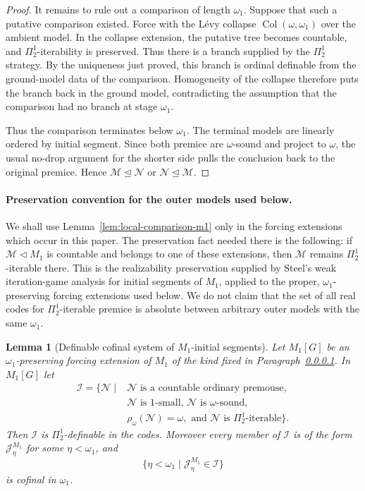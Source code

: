 \documentclass[a4paper,11pt]{article}
\newtheorem{lemma}[theorem]{Lemma}
\begin{document}
\begin{proof}
It remains to rule out a comparison of length $\omega_1$.  Suppose that such a putative comparison existed.  Force with the L\'evy collapse $\operatorname{Col}(\omega,\omega_1)$ over the ambient model.  In the collapse extension, the putative tree becomes countable, and $\Pi^1_2$-iterability is preserved.  Thus there is a branch supplied by the $\Pi^1_2$ strategy.  By the uniqueness just proved, this branch is ordinal definable from the ground-model data of the comparison.  Homogeneity of the collapse therefore puts the branch back in the ground model, contradicting the assumption that the comparison had no branch at stage $\omega_1$.

Thus the comparison terminates below $\omega_1$.  The terminal models are linearly ordered by initial segment.  Since both premice are $\omega$-sound and project to $\omega$, the usual no-drop argument for the shorter side pulls the conclusion back to the original premice.  Hence $\mathcal M\trianglelefteq\mathcal N$ or $\mathcal N\trianglelefteq\mathcal M$.
\end{proof}

\paragraph{Preservation convention for the outer models used below.}\label{par:steel-preservation-convention}
We shall use Lemma~\ref{lem:local-comparison-m1} only in the forcing extensions which occur in this paper.  The preservation fact needed there is the following: if $\mathcal M\triangleleft M_1$ is countable and belongs to one of these extensions, then $\mathcal M$ remains $\Pi^1_2$-iterable there.  This is the realizability preservation supplied by Steel's weak iteration-game analysis for initial segments of $M_1$, applied to the proper, $\omega_1$-preserving forcing extensions used below.  We do not claim that the set of all real codes for $\Pi^1_2$-iterable premice is absolute between arbitrary outer models with the same $\omega_1$.

\begin{lemma}[Definable cofinal system of $M_1$-initial segments]
\label{lem:definable-m1-initial-segments}
Let $M_1[G]$ be an $\omega_1$-preserving forcing extension of $M_1$ of the kind fixed in Paragraph~\ref{par:steel-preservation-convention}.  In $M_1[G]$ let
\[
\begin{split}
   \mathcal I=\bigl\{\mathcal N\mid {}&
      \mathcal N\text{ is a countable ordinary premouse, }\\
      &\mathcal N\text{ is }1\text{-small, }\mathcal N\text{ is }\omega\text{-sound, }\\
      &\rho_\omega(\mathcal N)=\omega,
        \text{ and }\mathcal N\text{ is }\Pi^1_2\text{-iterable}\bigr\}.
\end{split}
\]
Then $\mathcal I$ is $\Pi^1_2$-definable in the codes.  Moreover every member of $\mathcal I$ is of the form $\mathcal J_\eta^{M_1}$ for some $\eta<\omega_1$, and
\[
   \{\eta<\omega_1\mid \mathcal J_\eta^{M_1}\in\mathcal I\}
\]
is cofinal in $\omega_1$.
\end{lemma}
\end{document}
